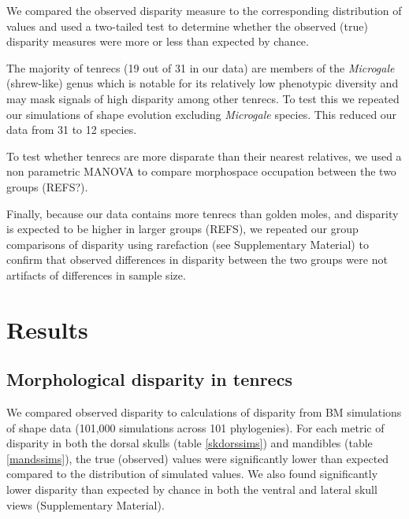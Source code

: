 \documentclass[12pt,a4paper]{article}
\begin{document}

We compared the observed disparity measure to the corresponding distribution of values and used a two-tailed test to determine whether the observed (true) disparity measures were more or less than expected by chance.

The majority of tenrecs (19 out of 31 in our data) are members of the \textit{Microgale} (shrew-like) genus which is notable for its relatively low phenotypic diversity \citep{ Soarimalala2011, Jenkins2003} and may mask signals of high disparity among other tenrecs. To test this we repeated our simulations of shape evolution excluding \textit{Microgale} species. This reduced our data from 31 to 12 species. %

To test whether tenrecs are more disparate than their nearest relatives, we used a non parametric MANOVA \citep{Anderson2001} to compare morphospace occupation between the two groups (REFS?). 

Finally, because our data contains more tenrecs than golden moles, and disparity is expected to be higher in larger groups (REFS), we repeated our group comparisons of disparity %
using rarefaction (see Supplementary Material) to confirm that observed differences in disparity between the two groups were not artifacts of differences in sample size.

\section{Results}

\subsection{Morphological disparity in tenrecs} %

We compared observed disparity to calculations of disparity from BM simulations of shape data (101,000 simulations across 101 phylogenies). For each metric of disparity in both the dorsal skulls (table \ref{skdorssims}) and mandibles (table \ref{mandssims}), the true (observed) values were significantly lower than expected compared to the distribution of simulated values. We also found significantly lower disparity than expected by chance in both the ventral and lateral skull views (Supplementary Material).
\end{document}
